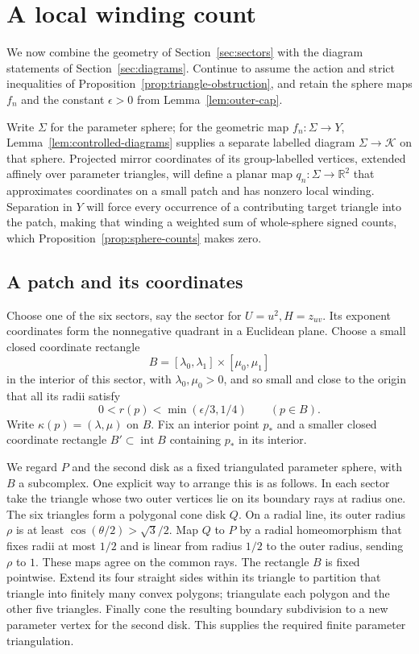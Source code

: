 \section{A local winding count}\label{sec:localization}

We now combine the geometry of Section~\ref{sec:sectors} with the
diagram statements of Section~\ref{sec:diagrams}.
Continue to assume the action and strict inequalities of
Proposition~\ref{prop:triangle-obstruction}, and retain the sphere maps
\(f_n\) and the constant \(\epsilon>0\) from
Lemma~\ref{lem:outer-cap}.

Write $\Sigma$ for the parameter sphere; for the geometric map
$f_n:\Sigma\to Y$, Lemma~\ref{lem:controlled-diagrams} supplies a
separate labelled diagram $\Sigma\to\mathcal K$ on that sphere.
Projected mirror coordinates of its group-labelled vertices, extended
affinely over parameter triangles, will define a planar map
$q_n:\Sigma\to\mathbb R^2$ that approximates coordinates on a small
patch and has nonzero local winding.  Separation in $Y$ will force every
occurrence of a contributing target triangle into the patch, making that
winding a weighted sum of whole-sphere signed counts, which
Proposition~\ref{prop:sphere-counts} makes zero.

\subsection{A patch and its coordinates}\label{sec:local-patch}

Choose one of the six sectors, say the sector for
\(U=u^2,H=z_{uv}\).  Its exponent coordinates form the nonnegative
quadrant in a Euclidean plane.  Choose a small closed coordinate
rectangle
\[
 B=[\lambda_0,\lambda_1]\times[\mu_0,\mu_1]
\]
in the interior of this sector, with \(\lambda_0,\mu_0>0\), and so small
and close to the origin that all its radii satisfy
\begin{equation}\label{eq:small-patch}
 0<r(p)<\min(\epsilon/3,1/4)\qquad(p\in B).
\end{equation}
Write \(\kappa(p)=(\lambda,\mu)\) on \(B\).  Fix an interior point
\(p_*\) and a smaller closed coordinate rectangle
\(B'\subset\operatorname{int}B\) containing \(p_*\) in its interior.

We regard \(P\) and the second disk as a fixed triangulated parameter
sphere, with \(B\) a subcomplex.  One explicit way to arrange this is
as follows.  In each sector take the triangle whose two outer vertices
lie on its boundary rays at radius one.  The six triangles form a
polygonal cone disk \(Q\).  On a radial line, its outer radius \(\rho\)
is at least \(\cos(\theta/2)>\sqrt3/2\).  Map \(Q\) to \(P\) by a
radial homeomorphism that fixes radii at most \(1/2\) and is linear
from radius \(1/2\) to the outer radius, sending \(\rho\) to \(1\).
These maps agree on the common rays.  The rectangle \(B\) is fixed
pointwise.  Extend its four straight sides within its triangle to
partition that triangle into finitely many convex polygons; triangulate
each polygon and the other five triangles.  Finally cone the resulting
boundary subdivision to a new parameter vertex for the second disk.
This supplies the required finite parameter triangulation.


